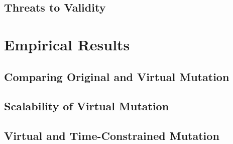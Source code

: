 \subsection{Threats to Validity}
\label{sec:threats-to-validity}


\section{Empirical Results}
\label{sec:empirical-results}


\subsection{Comparing Original and Virtual Mutation}
\label{sec:empirical-study-RQ-original-virtual-time}



\subsection{Scalability of Virtual Mutation}
\label{sec:empirical-study-RQ-scalability-mutants-tests}



\subsection{Virtual and Time-Constrained Mutation}
\label{sec:empirical-study-RQ-virtual-time-constrained-virtual}


